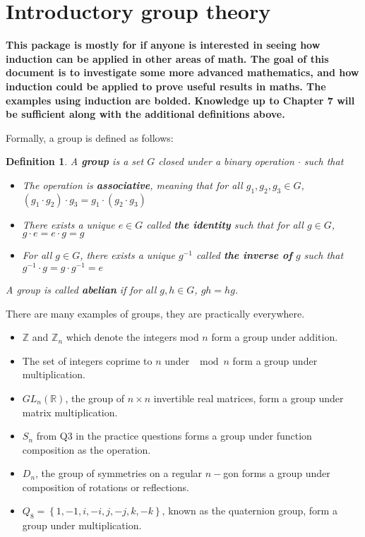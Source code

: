 \documentclass[letterpaper,12pt]{article}
\newcommand{\set}[1]{\left\{ #1 \right\}}
\newtheorem{definition}{Definition}[section]
\begin{document}
\section{Introductory group theory}
\textbf{This package is mostly for if anyone is interested in seeing how induction can be applied in other areas of math. The goal of this document is to investigate some more advanced mathematics, and how induction could be applied to prove useful results in maths. The examples using induction are bolded. Knowledge up to Chapter 7 will be sufficient along with the additional definitions above.} \par
Formally, a group is defined as follows:
\setcounter{section}{1}
\begin{definition}{1}
    A \textbf{group} is a set $G$ closed under a binary operation $\cdot$ such that \begin{itemize}
        \item The operation is \textbf{associative}, meaning that for all $g_1,g_2,g_3 \in G$, $(g_1 \cdot g_2)\cdot g_3 = g_1 \cdot (g_2 \cdot g_3)$
        \item There exists a unique $e \in G$ called \textbf{the identity} such that for all $g \in G$, $g \cdot e = e \cdot g = g$
        \item For all $g \in G$, there exists a unique $g^{-1}$ called \textbf{the inverse of} $g$ such that $g^{-1} \cdot g = g \cdot g^{-1} = e$
    \end{itemize}
    A group is called \textbf{abelian} if for all $g,h \in G$, $gh=hg$.
\end{definition}
There are many examples of groups, they are practically everywhere. \begin{itemize}
    \item $\mathbb{Z}$ and $\mathbb{Z}_n$ which denote the integers mod $n$ form a group under addition.
    \item The set of integers coprime to $n$ under $\mod n$ form a group under multiplication.
    \item $GL_n(\mathbb{R})$, the group of $n\times n$ invertible real matrices, form a group under matrix multiplication.
    \item $S_n$ from Q3 in the practice questions forms a group under function composition as the operation.
    \item $D_n$, the group of symmetries on a regular $n-$gon forms a group under composition of rotations or reflections.
    \item $Q_8 = \set{1,-1,i,-i,j,-j,k,-k}$, known as the quaternion group, form a group under multiplication.
\end{itemize}
\end{document}
